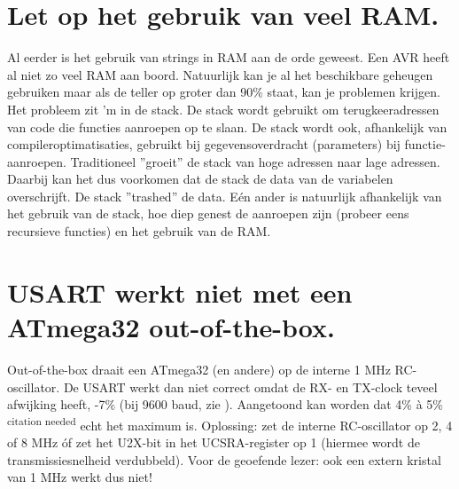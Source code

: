 \documentclass[12pt,a4paper,final,oneside,fleqn]{article}
\begin{document}
\section{Let op het gebruik van veel RAM.}
Al eerder is het gebruik van strings in RAM aan de orde geweest. Een AVR heeft al
niet zo veel RAM aan boord. Natuurlijk kan je al het beschikbare geheugen gebruiken
maar als de teller op groter dan 90\% staat, kan je problemen krijgen. Het probleem
zit 'm in de stack. De stack wordt gebruikt om terugkeeradressen van code die functies
aanroepen op te slaan. De stack wordt ook, afhankelijk van compileroptimatisaties,
gebruikt bij gegevensoverdracht (parameters) bij functie-aanroepen. Traditioneel
''groeit'' de stack van hoge adressen naar lage adressen. Daarbij kan het dus
voorkomen dat de stack de data van de variabelen overschrijft. De stack ''trashed''
de data.
E\'{e}n ander is natuurlijk afhankelijk van het gebruik van de stack, hoe diep genest
de aanroepen zijn (probeer eens recursieve functies) en het gebruik van de RAM.

\section{USART werkt niet met een ATmega32 out-of-the-box.}
Out-of-the-box draait een ATmega32 (en andere) op de interne 1 MHz RC-oscillator.
De USART werkt dan niet correct omdat de RX- en TX-clock teveel afwijking heeft, -7\%
(bij 9600 baud, zie \cite{atmega32doc2503}). Aangetoond kan worden dat 4\% \`{a} 5\%
\textsuperscript{citation needed} echt het maximum is. 
Oplossing: zet de interne RC-oscillator op 2, 4 of 8 MHz \'{o}f zet het U2X-bit in het
UCSRA-register op 1 (hiermee wordt de transmissiesnelheid verdubbeld). Voor de geoefende lezer:
ook een extern kristal van 1 MHz werkt dus niet!
\end{document}
